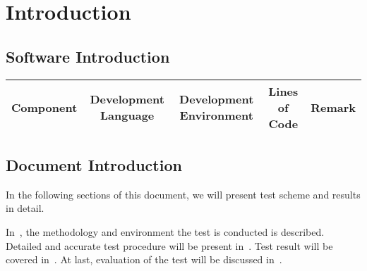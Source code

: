 
\section{Introduction}
\label{sec:intro}
\subsection{Software Introduction}
\begin{table}[!ht]
	\begin{tabular}{|c|c|c|c|c|}
		\hline
		Component & Development Language & Development Environment & Lines of Code & Remark \\\hline
	\end{tabular}
\end{table}

\subsection{Document Introduction}
\label{sec:introduction}
	In the following sections of this document, we will present test scheme and
	results in detail.

	In~, the methodology and environment the test is conducted
	is described. Detailed and accurate test procedure will be present in~.
	Test result will be covered in~. At last, evaluation of the test
	will be discussed in~.

